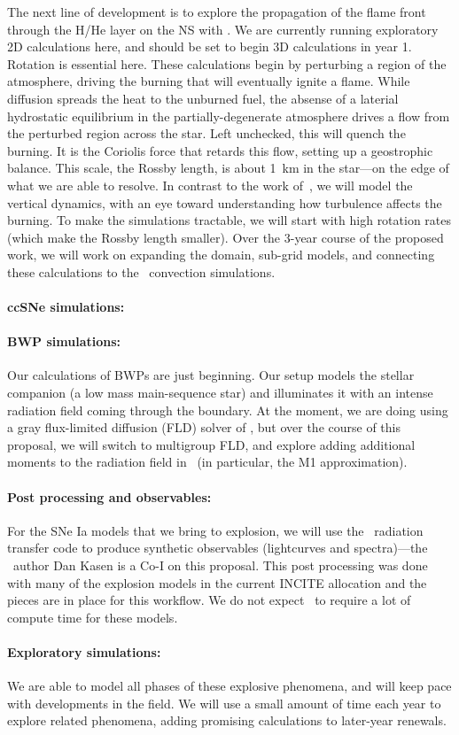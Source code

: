 The next line of development is to explore the propagation of the
flame front through the H/He layer on the NS with \castro.  We are
currently running exploratory 2D calculations here, and should be set
to begin 3D calculations in year 1.  Rotation is essential here.
These calculations begin by perturbing a region of the atmosphere,
driving the burning that will eventually ignite a flame.  While
diffusion spreads the heat to the unburned fuel, the absense of a
laterial hydrostatic equilibrium in the partially-degenerate
atmosphere drives a flow from the perturbed region across the star.
Left unchecked, this will quench the burning.  It is the Coriolis
force that retards this flow, setting up a geostrophic balance.  This
scale, the Rossby length, is about 1~km in the star---on the edge of
what we are able to resolve.  In contrast to the work
of~\cite{cavecchi:2013}, we will model the vertical dynamics, with an
eye toward understanding how turbulence affects the burning.  To make
the simulations tractable, we will start with high rotation rates
(which make the Rossby length smaller).  Over the 3-year course of the
proposed work, we will work on expanding the domain, sub-grid models,
and connecting these calculations to the \maestro\ convection
simulations.


\paragraph{ccSNe simulations: } 


\paragraph{BWP simulations: }  Our calculations of BWPs are just beginning.
Our setup models the stellar companion (a low mass main-sequence star)
and illuminates it with an intense radiation field coming through the
boundary.  At the moment, we are doing using a gray flux-limited
diffusion (FLD) solver of \castro, but over the course of this
proposal, we will switch to multigroup FLD, and explore adding
additional moments to the radiation field in \castro\ (in particular,
the M1 approximation).  


\paragraph{Post processing and observables: }
%
For the SNe Ia models that we bring to explosion, we will use the 
\sedona\ radiation transfer code to produce synthetic observables
(lightcurves and spectra)---the \sedona\ author Dan Kasen is a Co-I on
this proposal.  This post processing was done with many of the explosion 
models in the current INCITE allocation and the pieces are in place for this
workflow. We do not expect \sedona\ to require a lot of compute
time for these models.


\paragraph{Exploratory simulations: }
%
We are able to model all phases of these explosive phenomena, and will
keep pace with developments in the field.  We will use a small amount
of time each year to explore related phenomena, adding promising
calculations to later-year renewals.



